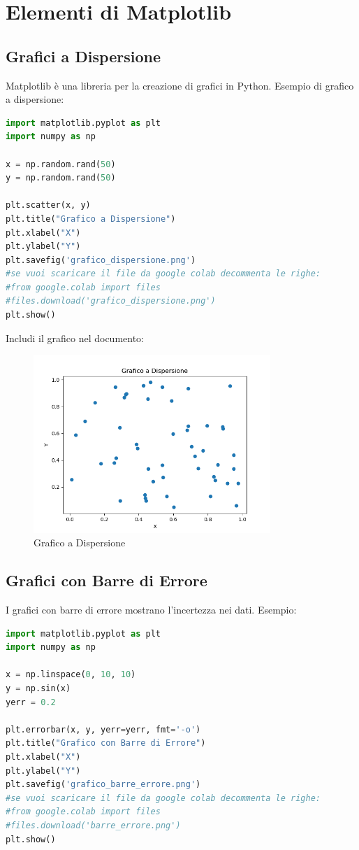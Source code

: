 \section{Elementi di Matplotlib}

\subsection{Grafici a Dispersione}
Matplotlib è una libreria per la creazione di grafici in Python. Esempio di grafico a dispersione:
\begin{lstlisting}[language=Python]
import matplotlib.pyplot as plt
import numpy as np

x = np.random.rand(50)
y = np.random.rand(50)

plt.scatter(x, y)
plt.title("Grafico a Dispersione")
plt.xlabel("X")
plt.ylabel("Y")
plt.savefig('grafico_dispersione.png')
#se vuoi scaricare il file da google colab decommenta le righe:
#from google.colab import files
#files.download('grafico_dispersione.png')
plt.show()
\end{lstlisting}

Includi il grafico nel documento:
\begin{figure}[h!]
    \centering
    \includegraphics[width=0.8\textwidth]{grafico_dispersione.png}
    \caption{Grafico a Dispersione}
    \label{fig:grafico_dispersione}
\end{figure}

\subsection{Grafici con Barre di Errore}
I grafici con barre di errore mostrano l'incertezza nei dati. Esempio:
\begin{lstlisting}[language=Python]
import matplotlib.pyplot as plt
import numpy as np

x = np.linspace(0, 10, 10)
y = np.sin(x)
yerr = 0.2

plt.errorbar(x, y, yerr=yerr, fmt='-o')
plt.title("Grafico con Barre di Errore")
plt.xlabel("X")
plt.ylabel("Y")
plt.savefig('grafico_barre_errore.png')
#se vuoi scaricare il file da google colab decommenta le righe:
#from google.colab import files
#files.download('barre_errore.png')
plt.show()
\end{lstlisting}

